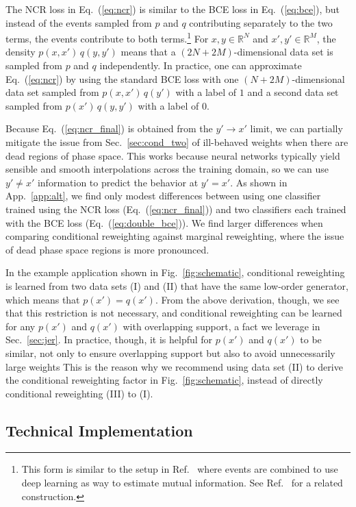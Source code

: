 \documentclass[aps,prx,reprint,preprintnumbers,superscriptaddress,nofootinbib,longbibliography,floatfix]{revtex4-2}
\DeclareRobustCommand{\Sec}[1]{Sec.~\ref{sec:#1}}
\DeclareRobustCommand{\App}[1]{App.~\ref{app:#1}}
\DeclareRobustCommand{\Fig}[1]{Fig.~\ref{fig:#1}}
\DeclareRobustCommand{\Eq}[1]{Eq.~(\ref{eq:#1})}
\DeclareRobustCommand{\Ref}[1]{Ref.~\cite{#1}}
\begin{document}
The NCR loss in \Eq{ncr} is similar to the BCE loss in \Eq{bce}, but instead of the events sampled from $p$ and $q$ contributing separately to the two terms, the events contribute to both terms.\footnote{This form is similar to the setup in \Ref{pmlr-v80-belghazi18a,2101.07263,Kim:2021pcz} where events are combined to use deep learning as way to estimate mutual information. See \Ref{Miller:2021hys} for a related construction.}
%
For $x,y\in\mathbb{R}^N$ and $x',y'\in\mathbb{R}^M$, the density $p(x,x')\,q(y,y')$ means that a $(2N+2M)$-dimensional data set is sampled from $p$ and $q$ independently.
%
In practice, one can approximate \Eq{ncr} by using the standard BCE loss with one $(N+2M)$-dimensional data set sampled from $p(x,x')\,q(y')$ with a label of $1$ and a second data set sampled from $p(x')\,q(y,y')$ with a label of $0$.


Because \Eq{ncr_final} is obtained from the $y' \to x'$ limit, we can partially mitigate the issue from \Sec{cond_two} of ill-behaved weights when there are dead regions of phase space.
%
This works because neural networks typically yield sensible and smooth interpolations across the training domain, so we can use $y' \not= x'$ information to predict the behavior at $y'=x'$.
%
As shown in \App{alt}, we find only modest differences between using one classifier trained using the NCR loss (\Eq{ncr_final}) and two classifiers each trained with the BCE loss (\Eq{double_bce}).
%
We find larger differences when comparing conditional reweighting against marginal reweighting, where the issue of dead phase space regions is more pronounced.


In the example application shown in \Fig{schematic}, conditional reweighting is learned from two data sets (I) and (II) that have the same low-order generator, which means that $p(x') = q(x')$.
%
From the above derivation, though, we see that this restriction is not necessary, and conditional reweighting can be learned for any $p(x')$ and $q(x')$ with overlapping support, a fact we leverage in \Sec{jer}.
%
In practice, though, it is helpful for $p(x')$ and $q(x')$ to be similar, not only to ensure overlapping support but also to avoid unnecessarily large weights
%
This is the reason why we recommend using data set (II) to derive the conditional reweighting factor in \Fig{schematic}, instead of directly conditional reweighting (III) to (I).


\subsection{Technical Implementation}
\end{document}
